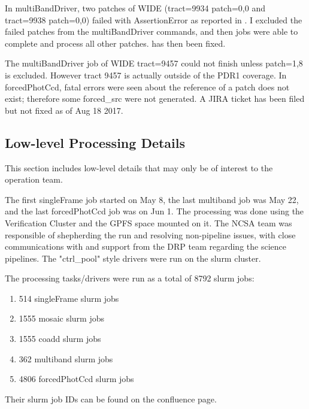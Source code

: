 \documentclass[DM,authoryear,toc]{lsstdoc}
\begin{document}
In multiBandDriver, two patches of WIDE (tract=9934 patch=0,0  and  tract=9938 patch=0,0) failed with AssertionError as reported in . I excluded the failed patches from the multiBandDriver commands, and then jobs were able to complete and process all other patches.  has then been fixed.

The multiBandDriver job of WIDE tract=9457 could not finish unless patch=1,8 is excluded. However tract 9457 is actually outside of the PDR1 coverage.
In forcedPhotCcd, fatal errors were seen about the reference of a patch does not exist; therefore some forced{\_}src were not generated. A JIRA ticket  has been filed but not fixed as of Aug 18 2017.

\subsection{Low-level Processing Details}

This section includes low-level details that may only be of interest to the operation team.

The first singleFrame job started on May 8, the last multiband job was May 22, and the last forcedPhotCcd job was on Jun 1.  The processing was done using the Verification Cluster and the GPFS space mounted on it. The NCSA team was responsible of shepherding the run and resolving non-pipeline issues, with close communications with and support from the DRP team regarding the science pipelines.  The "ctrl{\_}pool" style drivers were run on the slurm cluster.

The processing tasks/drivers were run as a total of 8792 slurm jobs:
\begin{enumerate}
\item
514 singleFrame slurm jobs
\item
1555 mosaic slurm jobs
\item
1555 coadd slurm jobs
\item
362 multiband slurm jobs
\item
4806 forcedPhotCcd slurm jobs
\end{enumerate}
Their slurm job IDs can be found on the confluence page.
\end{document}
